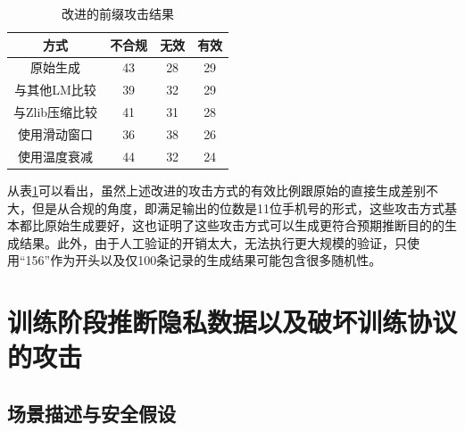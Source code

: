 \begin{table}[]
	\centering
	\caption{改进的前缀攻击结果}
	\begin{tabular}{|c|c|c|c|}
		\hline
		方式&不合规&无效&有效   \\ \hline
		原始生成&43&28&29    \\ \hline
		与其他LM比较&39&32&29    \\ \hline
		与Zlib压缩比较&41&31&28    \\ \hline
		使用滑动窗口&36&38&26    \\ \hline
		使用温度衰减&44&32&24    \\ \hline
	\end{tabular}
	\label{Remaster_Attack_Method_with_Num_Success}
\end{table}


从表\ref{Remaster_Attack_Method_with_Num_Success}可以看出，虽然上述改进的攻击方式的有效比例跟原始的直接生成差别不大，但是从合规的角度，即满足输出的位数是11位手机号的形式，这些攻击方式基本都比原始生成要好，这也证明了这些攻击方式可以生成更符合预期推断目的的生成结果。此外，由于人工验证的开销太大，无法执行更大规模的验证，只使用“156”作为开头以及仅100条记录的生成结果可能包含很多随机性。


\section{训练阶段推断隐私数据以及破坏训练协议的攻击}


\subsection{场景描述与安全假设}



